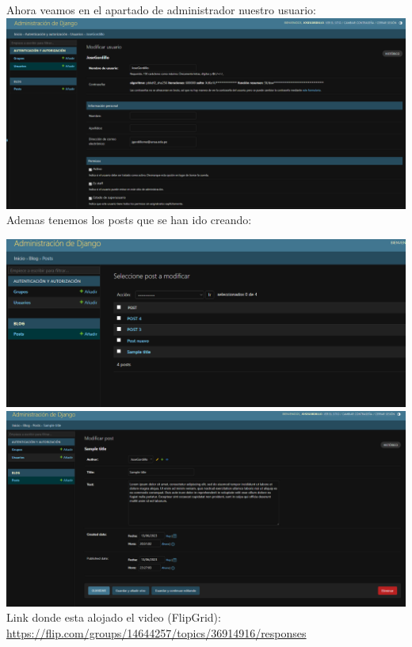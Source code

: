 \documentclass{article}
\begin{document}
        \newline\newline\newline
        Ahora veamos en el apartado de administrador nuestro usuario:
        \newline\newline
        \includegraphics[width=16cm]{img/USUARIO.png}
        Ademas tenemos los posts que se han ido creando:\newline
    
        \includegraphics[width=16cm]{img/LISTADOposts.png}
        \newline\newline
        \includegraphics[width=16cm]{img/POSTejemplo.png}
        \newline
        Link donde esta alojado el video (FlipGrid): \url{https://flip.com/groups/14644257/topics/36914916/responses}
\end{document}

